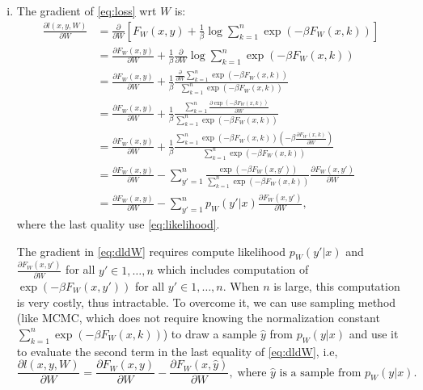 \documentclass[10pt,a4paper]{article}
\theoremstyle{dotlessP}
\begin{document}
\begin{enumerate}[(i)]
	\item The gradient of \eqref{eq:loss} wrt $W$ is:
	\begin{equation}\label{eq:dldW}
	\begin{aligned}
	\frac{\partial l(x,y, W)}{\partial W} & = \frac{\partial}{\partial W}[F_W(x,y) + \frac{1}{\beta}\log \sum\limits_{k=1}^{n}\exp(-\beta F_W(x,k)) ]\\
	& = \frac{\partial F_W(x,y)}{\partial W} + \frac{1}{\beta}  \frac{\partial}{\partial W} \log \sum\limits_{k=1}^{n}\exp(-\beta F_W(x,k)) \\
	& = \frac{\partial F_W(x,y)}{\partial W} + \frac{1}{\beta} \frac{\frac{\partial}{\partial W}\sum\limits_{k=1}^{n}\exp(-\beta F_W(x,k))  }{\sum\limits_{k=1}^{n}\exp(-\beta F_W(x,k))  }\\
	& = \frac{\partial F_W(x,y)}{\partial W} + \frac{1}{\beta} \frac{ \sum\limits_{k=1}^{n} \frac{\partial \exp(-\beta F_W(x,k))}{\partial W} }{\sum\limits_{k=1}^{n}\exp(-\beta F_W(x,k))  }\\
	& = \frac{\partial F_W(x,y)}{\partial W} + \frac{1}{\beta} \frac{ \sum\limits_{k=1}^{n}\exp(-\beta F_W(x,k)) (-\beta \frac{\partial F_W(x,k)}{\partial W}) }{\sum\limits_{k=1}^{n}\exp(-\beta F_W(x,k))  }\\
	& = \frac{\partial F_W(x,y)}{\partial W} - \sum\limits_{y'=1}^{n} \frac{\exp(-\beta F_W(x,y'))}{\sum\limits_{k=1}^{n}\exp(-\beta F_W(x,k))  } \frac{\partial F_W(x,y')}{\partial W}\\
	& = \frac{\partial F_W(x,y)}{\partial W} -  \sum\limits_{y'=1}^{n}  p_W(y'|x) \frac{\partial F_W(x,y')}{\partial W},
	\end{aligned}
	\end{equation}
	where the last quality use \eqref{eq:likelihood}.
	
	The gradient in \eqref{eq:dldW} requires compute likelihood $p_W(y'|x)$ and $\frac{\partial F_W(x,y')}{\partial W}$ for all $y'\in {1,\ldots,n}$ which includes computation of $\exp(-\beta F_W(x,y')) $  for all $y'\in {1,\ldots,n}$. When $n$ is large, this computation is very costly, thus intractable. To overcome it, we can use sampling method (like MCMC, which does not require knowing the normalization constant $\sum\limits_{k=1}^{n}\exp(-\beta F_W(x,k)) $) to draw a sample $\hat{y}$ from $p_W(y|x)$ and use it to evaluate the second term in the last equality of \eqref{eq:dldW}, i.e, 
	\begin{equation}
\frac{\partial l(x,y, W)}{\partial W} = \frac{\partial F_W(x,y)}{\partial W} - \frac{\partial F_W(x,\hat{y})}{\partial W}, \; \text{where } \hat{y}\text{ is a sample from } p_W(y|x).
	\end{equation}
	

\end{enumerate}
\end{document}
